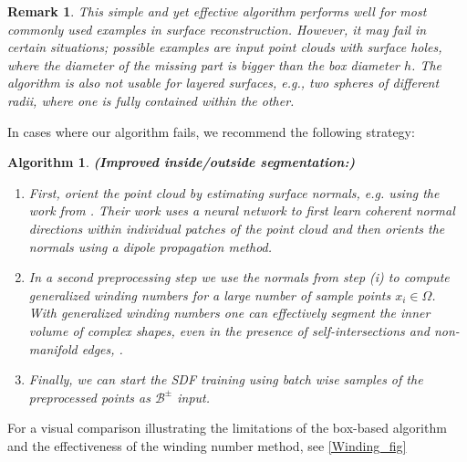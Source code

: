 \documentclass[12pt,openany]{book}
\theoremstyle{plainnormal}
\newtheorem{remark}[theorem]{Remark}
\newtheorem{algorithm}[theorem]{Algorithm}
\theoremstyle{remark}
\begin{document}
\begin{remark}
    This simple and yet effective algorithm performs well for most commonly used examples in surface reconstruction. However, it may fail in certain situations; possible examples are input point clouds with surface holes, where the diameter of the missing part is bigger than the box diameter $h$. The algorithm is also not usable for layered surfaces, e.g., two spheres of different radii, where one is fully contained within the other.
\end{remark}
    In cases where our algorithm fails, we recommend the following strategy: 
    \begin{algorithm}\label{improvedInsideOutside}\textbf{(Improved inside/outside segmentation:)}
        \begin{enumerate}
            \item First, orient the point cloud by estimating surface normals, e.g. using the work from \cite{Metzer_2021}. Their work uses a neural network to first learn coherent normal directions within individual patches of the point cloud and then orients the normals using a dipole propagation method. 
            \item In a second preprocessing step we use the normals from step (i) to compute generalized winding numbers for a large number of sample points $x_i\in \Omega$. With generalized winding numbers one can effectively segment the inner volume of complex shapes, even in the presence of self-intersections and non-manifold edges, \cite{10.1145/2461912.2461916}.
            \item Finally, we can start the SDF training using batch wise samples of the preprocessed points as $\mathcal{B}^\pm$ input.
        \end{enumerate}
    \end{algorithm} 
    For a visual comparison illustrating the limitations of the box-based algorithm and the effectiveness of the winding number method, see \cref{Winding_fig}
\end{document}
